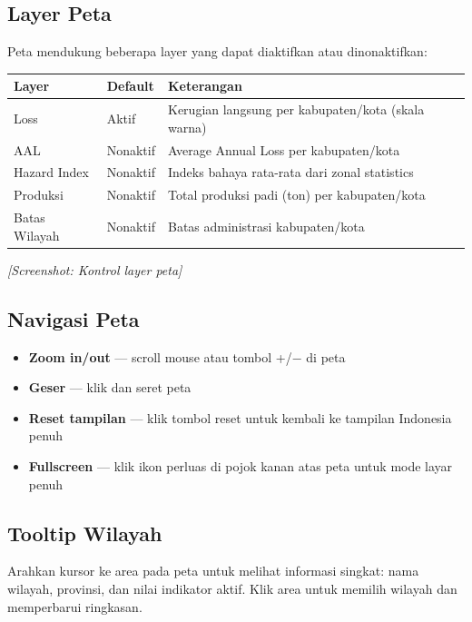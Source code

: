 \documentclass[12pt, a4paper]{article}
\newcommand{\screenshot}[1]{%
    \begin{center}
      \begin{tcolorbox}[
        enhanced,
        colback  = sectiongray,
        colframe = padisborder,
        arc      = 6pt,
        boxrule  = 0.6pt,
        height   = 5.5cm,
        valign   = center,
        halign   = center,
        fontupper = \sffamily\small\color{padismuted},
      ]
        \textit{[Screenshot: #1]}
      \end{tcolorbox}
    \end{center}%
  }
\begin{document}
  \subsection{Layer Peta}

  Peta mendukung beberapa layer yang dapat diaktifkan atau dinonaktifkan:

  \begin{center}
  \begin{tabularx}{\textwidth}{@{} l l X @{}}
    \toprule
    \textbf{Layer}  & \textbf{Default} & \textbf{Keterangan} \\
    \midrule
    Loss            & Aktif    & Kerugian langsung per kabupaten/kota (skala warna) \\
    AAL             & Nonaktif & Average Annual Loss per kabupaten/kota \\
    Hazard Index    & Nonaktif & Indeks bahaya rata-rata dari zonal statistics \\
    Produksi        & Nonaktif & Total produksi padi (ton) per kabupaten/kota \\
    Batas Wilayah   & Nonaktif & Batas administrasi kabupaten/kota \\
    \bottomrule
  \end{tabularx}
  \end{center}

  \screenshot{Kontrol layer peta}

  \subsection{Navigasi Peta}

  \begin{itemize}
    \item \textbf{Zoom in/out} — scroll mouse atau tombol +/− di peta
    \item \textbf{Geser} — klik dan seret peta
    \item \textbf{Reset tampilan} — klik tombol reset untuk kembali ke tampilan Indonesia penuh
    \item \textbf{Fullscreen} — klik ikon perluas di pojok kanan atas peta untuk mode layar penuh
  \end{itemize}

  \subsection{Tooltip Wilayah}

  Arahkan kursor ke area pada peta untuk melihat informasi singkat: nama wilayah, provinsi,
  dan nilai indikator aktif. Klik area untuk memilih wilayah dan memperbarui ringkasan.
\end{document}
